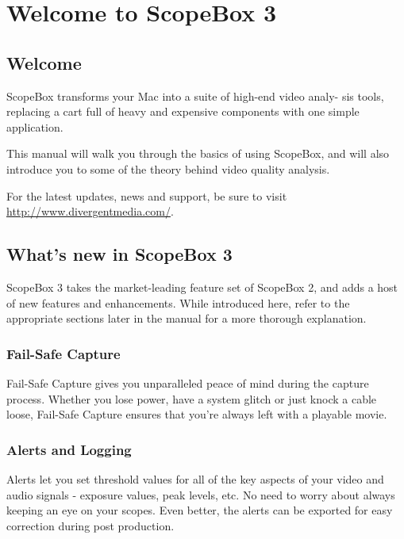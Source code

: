 \documentclass[10,letterpaper,]{report}
\author{}
\date{}
\begin{document}
{
\hypersetup{linkcolor=black}
\setcounter{tocdepth}{3}
\tableofcontents
}

\raggedright
\chapter{Welcome to ScopeBox 3}

\section{Welcome}

ScopeBox transforms your Mac into a suite of high-end video analy- sis
tools, replacing a cart full of heavy and expensive components with one
simple application.

This manual will walk you through the basics of using ScopeBox, and will
also introduce you to some of the theory behind video quality analysis.

For the latest updates, news and support, be sure to visit
\url{http://www.divergentmedia.com/}.

\section{What's new in ScopeBox 3}

ScopeBox 3 takes the market-leading feature set of ScopeBox 2, and adds
a host of new features and enhancements. While introduced here, refer to
the appropriate sections later in the manual for a more thorough
explanation.

\subsection{Fail-Safe Capture}

Fail-Safe Capture gives you unparalleled peace of mind during the
capture process. Whether you lose power, have a system glitch or just
knock a cable loose, Fail-Safe Capture ensures that you're always left
with a playable movie.

\subsection{Alerts and Logging}

Alerts let you set threshold values for all of the key aspects of your
video and audio signals - exposure values, peak levels, etc. No need to
worry about always keeping an eye on your scopes. Even better, the
alerts can be exported for easy correction during post production.
\end{document}
